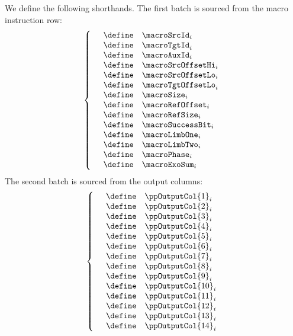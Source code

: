 \begin{center}
\end{center}
We define the following shorthands.
The first batch is sourced from the macro instruction row:
\[
	\left\{ \begin{array}{lcl}
		& \define & \macroSrcId_{i} \\
		& \define & \macroTgtId_{i} \\
		& \define & \macroAuxId_{i} \\
		& \define & \macroSrcOffsetHi_{i} \\
		& \define & \macroSrcOffsetLo_{i} \\
		& \define & \macroTgtOffsetLo_{i} \\
		& \define & \macroSize_{i} \\
		& \define & \macroRefOffset_{i} \\
		& \define & \macroRefSize_{i} \\
		& \define & \macroSuccessBit_{i} \\
		& \define & \macroLimbOne_{i} \\
		& \define & \macroLimbTwo_{i} \\
		& \define & \macroPhase_{i} \\
		& \define & \macroExoSum_{i} \\
	\end{array} \right.
\]
The second batch is sourced from the output columns:
\[
	\left\{ \begin{array}{lcl}
		& \define & \ppOutputCol{1}_{i} \\
		& \define & \ppOutputCol{2}_{i} \\
		& \define & \ppOutputCol{3}_{i} \\
		& \define & \ppOutputCol{4}_{i} \\
		& \define & \ppOutputCol{5}_{i} \\
		& \define & \ppOutputCol{6}_{i} \\
		& \define & \ppOutputCol{7}_{i} \\
		& \define & \ppOutputCol{8}_{i} \\
		& \define & \ppOutputCol{9}_{i} \\
		& \define & \ppOutputCol{10}_{i} \\
		& \define & \ppOutputCol{11}_{i} \\
		& \define & \ppOutputCol{12}_{i} \\
		& \define & \ppOutputCol{13}_{i} \\
		& \define & \ppOutputCol{14}_{i} \\
	\end{array} \right.
\]

